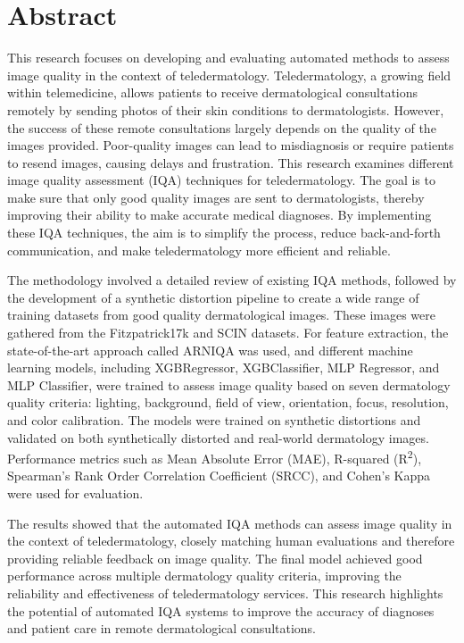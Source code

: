 \documentclass[a4paper, top=2cm, bottom=2cm, left=2.5cm, right=2.5cm, chapterprefix=true, numbers=noenddot]{scrreprt}
\begin{document}



\chapter*{Abstract}
This research focuses on developing and evaluating automated methods to assess image quality in the context of teledermatology. Teledermatology, a growing field within telemedicine, allows patients to receive dermatological consultations remotely by sending photos of their skin conditions to dermatologists. However, the success of these remote consultations largely depends on the quality of the images provided. Poor-quality images can lead to misdiagnosis or require patients to resend images, causing delays and frustration. This research examines different image quality assessment (IQA) techniques for teledermatology. The goal is to make sure that only good quality images are sent to dermatologists, thereby improving their ability to make accurate medical diagnoses. By implementing these IQA techniques, the aim is to simplify the process, reduce back-and-forth communication, and make teledermatology more efficient and reliable. \par
\vspace{\baselineskip}
\noindent
The methodology involved a detailed review of existing IQA methods, followed by the development of a synthetic distortion pipeline to create a wide range of training datasets from good quality dermatological images. These images were gathered from the Fitzpatrick17k and SCIN datasets. For feature extraction, the state-of-the-art approach called ARNIQA was used, and different machine learning models, including XGBRegressor, XGBClassifier, MLP Regressor, and MLP Classifier, were trained to assess image quality based on seven dermatology quality criteria: lighting, background, field of view, orientation, focus, resolution, and color calibration. The models were trained on synthetic distortions and validated on both synthetically distorted and real-world dermatology images. Performance metrics such as Mean Absolute Error (MAE), R-squared (R\textsuperscript{2}), Spearman’s Rank Order Correlation Coefficient (SRCC), and Cohen’s Kappa were used for evaluation. \par
\vspace{\baselineskip}
\noindent
The results showed that the automated IQA methods can assess image quality in the context of teledermatology, closely matching human evaluations and therefore providing reliable feedback on image quality. The final model achieved good performance across multiple dermatology quality criteria, improving the reliability and effectiveness of teledermatology services. This research highlights the potential of automated IQA systems to improve the accuracy of diagnoses and patient care in remote dermatological consultations. \par
\end{document}
